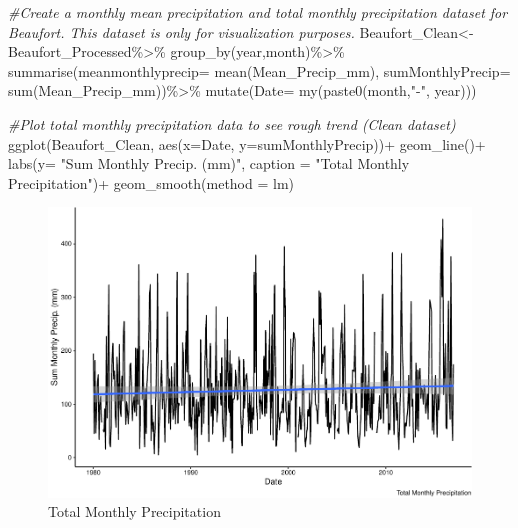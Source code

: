\documentclass[
  12pt,
]{article}
\newenvironment{Shaded}{\begin{snugshade}}{\end{snugshade}}
\newcommand{\AttributeTok}[1]{\textcolor[rgb]{0.77,0.63,0.00}{#1}}
\newcommand{\CommentTok}[1]{\textcolor[rgb]{0.56,0.35,0.01}{\textit{#1}}}
\newcommand{\FunctionTok}[1]{\textcolor[rgb]{0.00,0.00,0.00}{#1}}
\newcommand{\NormalTok}[1]{#1}
\newcommand{\OtherTok}[1]{\textcolor[rgb]{0.56,0.35,0.01}{#1}}
\newcommand{\SpecialCharTok}[1]{\textcolor[rgb]{0.00,0.00,0.00}{#1}}
\newcommand{\StringTok}[1]{\textcolor[rgb]{0.31,0.60,0.02}{#1}}
\begin{document}
\begin{Shaded}
\begin{Highlighting}[]
\CommentTok{\#Create a monthly mean precipitation and total monthly precipitation dataset for Beaufort. This dataset is only for visualization purposes. }
\NormalTok{Beaufort\_Clean}\OtherTok{\textless{}{-}}\NormalTok{ Beaufort\_Processed}\SpecialCharTok{\%\textgreater{}\%}
  \FunctionTok{group\_by}\NormalTok{(year,month)}\SpecialCharTok{\%\textgreater{}\%}
   \FunctionTok{summarise}\NormalTok{(}\AttributeTok{meanmonthlyprecip=} \FunctionTok{mean}\NormalTok{(Mean\_Precip\_mm),}
             \AttributeTok{sumMonthlyPrecip=} \FunctionTok{sum}\NormalTok{(Mean\_Precip\_mm))}\SpecialCharTok{\%\textgreater{}\%}
  \FunctionTok{mutate}\NormalTok{(}\AttributeTok{Date=} \FunctionTok{my}\NormalTok{(}\FunctionTok{paste0}\NormalTok{(month,}\StringTok{"{-}"}\NormalTok{, year)))}

\CommentTok{\#Plot total monthly precipitation data to see rough trend (Clean dataset)}
\FunctionTok{ggplot}\NormalTok{(Beaufort\_Clean, }\FunctionTok{aes}\NormalTok{(}\AttributeTok{x=}\NormalTok{Date, }\AttributeTok{y=}\NormalTok{sumMonthlyPrecip))}\SpecialCharTok{+}
  \FunctionTok{geom\_line}\NormalTok{()}\SpecialCharTok{+}
  \FunctionTok{labs}\NormalTok{(}\AttributeTok{y=} \StringTok{"Sum Monthly Precip. (mm)"}\NormalTok{, }\AttributeTok{caption =} \StringTok{"Total Monthly Precipitation"}\NormalTok{)}\SpecialCharTok{+}
  \FunctionTok{geom\_smooth}\NormalTok{(}\AttributeTok{method =}\NormalTok{ lm) }
\end{Highlighting}
\end{Shaded}

\begin{figure}
\centering
\includegraphics{Final_Project_Thornton_Katayama_Ngenzi_files/figure-latex/clean-1.pdf}
\caption{Total Monthly Precipitation}
\end{figure}
\end{document}

